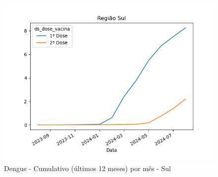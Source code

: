\documentclass[12pt]{article}
\begin{document}
\begin{figure}[H]
    \centering
    \includegraphics[width=0.85\linewidth]{imagens/Dengue-Sul-Cumulativo-mes}
    \caption{Dengue - Cumulativo (últimos 12 meses) por mês - Sul}
    \label{fig:dengue-sul-cumulativo-mes}
\end{figure}
\end{document}
